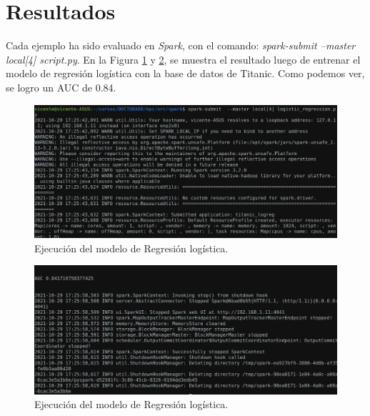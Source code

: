 \documentclass{article}
\begin{document}

\section{Resultados}

Cada ejemplo ha sido evaluado en \textit{Spark}, con el comando: \textit{spark-submit  --master local[4]  script.py}. En la Figura \ref{fig:spark_1} y \ref{fig:spark_2}, se muestra el resultado luego de entrenar el modelo de regresión logística con la base de datos de Titanic. Como podemos ver, se logro un AUC de 0.84.

\begin{figure}[H]
    \centering
    \includegraphics[width=15cm]{tareas/img/spark_1.jpg}
    \caption{Ejecución del modelo de Regresión logística.}
    \label{fig:spark_1}
\end{figure}

\begin{figure}[H]
    \centering
    \includegraphics[width=15cm]{tareas/img/spark_2.jpg}
    \caption{Ejecución del modelo de Regresión logística.}
    \label{fig:spark_2}
\end{figure}
\end{document}
